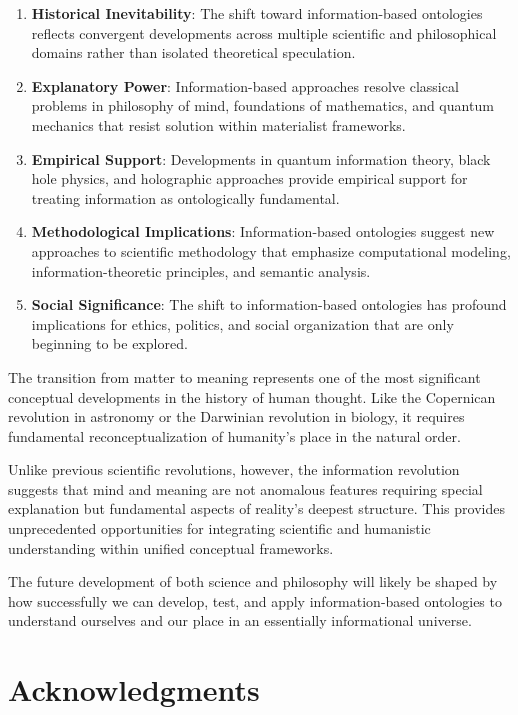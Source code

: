 \documentclass[12pt]{article}
\begin{document}
\begin{enumerate}
\item \textbf{Historical Inevitability}: The shift toward information-based ontologies reflects convergent developments across multiple scientific and philosophical domains rather than isolated theoretical speculation.

\item \textbf{Explanatory Power}: Information-based approaches resolve classical problems in philosophy of mind, foundations of mathematics, and quantum mechanics that resist solution within materialist frameworks.

\item \textbf{Empirical Support}: Developments in quantum information theory, black hole physics, and holographic approaches provide empirical support for treating information as ontologically fundamental.

\item \textbf{Methodological Implications}: Information-based ontologies suggest new approaches to scientific methodology that emphasize computational modeling, information-theoretic principles, and semantic analysis.

\item \textbf{Social Significance}: The shift to information-based ontologies has profound implications for ethics, politics, and social organization that are only beginning to be explored.
\end{enumerate}

The transition from matter to meaning represents one of the most significant conceptual developments in the history of human thought. Like the Copernican revolution in astronomy or the Darwinian revolution in biology, it requires fundamental reconceptualization of humanity's place in the natural order.

Unlike previous scientific revolutions, however, the information revolution suggests that mind and meaning are not anomalous features requiring special explanation but fundamental aspects of reality's deepest structure. This provides unprecedented opportunities for integrating scientific and humanistic understanding within unified conceptual frameworks.

The future development of both science and philosophy will likely be shaped by how successfully we can develop, test, and apply information-based ontologies to understand ourselves and our place in an essentially informational universe.

\section*{Acknowledgments}
\end{document}
